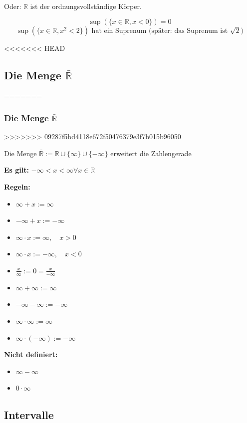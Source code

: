 \documentclass[fleqn]{scrbook}
\newenvironment{example}{{\bfseries Beispiel }}{}
\begin{document}
Oder: $\mathbb{R}$ ist der ordnungsvollständige Körper.

\begin{example}
\[\sup(\{x \in \mathbb{R}, x < 0\}) = 0\]
\[\sup(\{x \in \mathbb{R}, x^2 < 2\}) \text{ hat ein Suprenum (später: das Suprenum ist } \sqrt{2} \text{)}\]
\end{example}

<<<<<<< HEAD
\subsection{Die Menge $\bar{\mathbb{R}}$}
=======
\subsubsection{Die Menge \texorpdfstring{$\bar{\mathbb{R}}$}{R}}
>>>>>>> 09287f5bd4118e672f50476379e3f7b015b96050

Die Menge $\bar{\mathbb{R}}:= \mathbb{R} \cup \{\infty\} \cup \{-\infty\}$ erweitert die Zahlengerade

\textbf{Es gilt:} $-\infty < x < \infty \forall x \in \mathbb{R}$

\textbf{Regeln:}

\begin{itemize}
  \item $\infty + x := \infty$
  \item $-\infty + x := -\infty$
  \item $\infty  \cdot  x := \infty, \quad x>0$
  \item $\infty  \cdot  x := -\infty, \quad x<0$
  \item $\frac{x}{\infty}:=0=\frac{x}{-\infty}$
  \item $\infty + \infty := \infty$
  \item $-\infty - \infty := -\infty$
  \item $\infty  \cdot  \infty := \infty$
  \item $\infty  \cdot  (-\infty) := -\infty$
\end{itemize}

\textbf{Nicht definiert:}

\begin{itemize}
  \item $\infty-\infty$
  \item $0 \cdot \infty$
\end{itemize}

\subsection{Intervalle}
\end{document}
